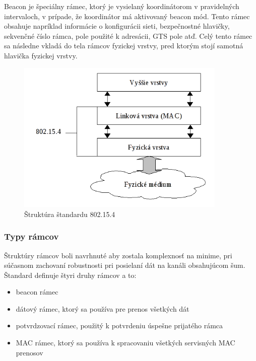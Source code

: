 \documentclass[11pt,twoside,a4paper]{book}
\begin{document}
Beacon je špeciálny rámec, ktorý je vysielaný koordinátorom v pravidelných intervaloch, v prípade, že koordinátor má aktivovaný beacon mód. Tento rámec obsahuje napríklad informácie o konfigurácii sieti, bezpečnostné hlavičky, sekvenčné číslo rámca, pole použité k adresácii, GTS pole atď. Celý tento rámec sa následne vkladá do tela rámcov fyzickej vrstvy, pred ktorým stojí samotná hlavička fyzickej vrstvy.

\begin{figure}[h]
 \centering
 \includegraphics[width=10cm]{./figures/layers802154.png}
 \caption{Štruktúra štandardu 802.15.4}
 \label{fig:802154layers}
\end{figure}

\subsubsection{Typy rámcov}
Štruktúry rámcov boli navrhnuté aby zostala komplexnosť na minime, pri súčasnom zachovaní robustnosti pri posielaní dát na kanáli obsahujúcom šum.
Štandard definuje štyri druhy rámcov a to:
\begin{itemize}
\item beacon rámec
\item dátový rámec, ktorý sa používa pre prenos všetkých dát
\item potvrdzovací rámec, použitý k potvrdeniu úspešne prijatého rámca
\item MAC rámec, ktorý sa používa k spracovaniu všetkých servisných MAC prenosov
\end{itemize}

\end{document}
